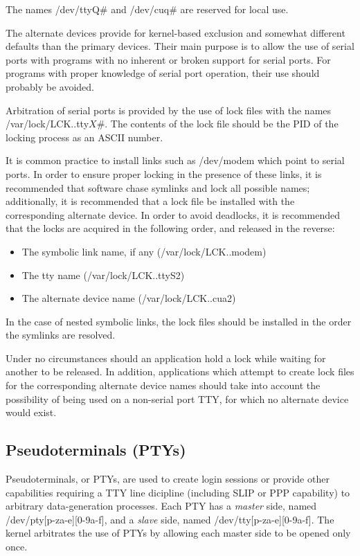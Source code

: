 The names {\file /dev/ttyQ$\#$} and {\file /dev/cuq$\#$} are reserved
for local use.

The alternate devices provide for kernel-based exclusion and somewhat
different defaults than the primary devices.  Their main purpose is to
allow the use of serial ports with programs with no inherent or broken
support for serial ports.  For programs with proper knowledge of
serial port operation, their use should probably be avoided.

Arbitration of serial ports is provided by the use of lock files with
the names {\file /var/lock/LCK..tty${X\#}$}.  The contents of the lock
file should be the PID of the locking process as an ASCII number.

It is common practice to install links such as {\file /dev/modem\/}
which point to serial ports.  In order to ensure proper locking in the
presence of these links, it is recommended that software chase
symlinks and lock all possible names; additionally, it is recommended
that a lock file be installed with the corresponding alternate
device.  In order to avoid deadlocks, it is recommended that the locks
are acquired in the following order, and released in the reverse:
\begin{itemize}
\item{The symbolic link name, if any ({\file /var/lock/LCK..modem})}
\item{The {\file tty} name ({\file /var/lock/LCK..ttyS2})}
\item{The alternate device name ({\file /var/lock/LCK..cua2})}
\end{itemize}
In the case of nested symbolic links, the lock files should be
installed in the order the symlinks are resolved.

Under no circumstances should an application hold a lock while waiting
for another to be released.  In addition, applications which attempt
to create lock files for the corresponding alternate device names
should take into account the possibility of being used on a non-serial
port TTY, for which no alternate device would exist.

\subsection{Pseudoterminals (PTYs)}

Pseudoterminals, or PTYs, are used to create login sessions or provide
other capabilities requiring a TTY line dicipline (including SLIP or
PPP capability) to arbitrary data-generation processes.  Each PTY has
a {\em master\/} side, named {\file /dev/pty[p-za-e][0-9a-f]\/}, and a
{\em slave\/} side, named {\file /dev/tty[p-za-e][0-9a-f]\/}.  The
kernel arbitrates the use of PTYs by allowing each master side to be
opened only once.

